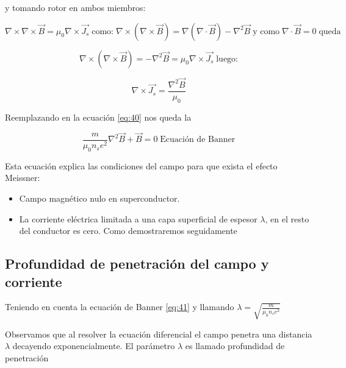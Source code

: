 y tomando rotor en ambos miembros:

\begin{equation*}
	\nabla \times \nabla \times \overrightarrow{B} = \mu_{0}\nabla \times \overrightarrow{J_{s}} \;\text{como:}\;
	\nabla \times (\nabla \times \overrightarrow{B})= \nabla (\nabla \cdot \overrightarrow{B}) - \nabla^{2} \overrightarrow{B}  \;\text{y como}\; \nabla \cdot \overrightarrow{B} =0 \;\text{queda}\;
\end{equation*}

\begin{equation*}
	\nabla \times (\nabla \times \overrightarrow{B})= - \nabla^{2} \overrightarrow{B} = \mu_{0} \nabla \times \overrightarrow{J_{s}}  \;\text{luego:}
\end{equation*}

\begin{equation*}
	\nabla \times \overrightarrow{J_{s}}=\frac{ \nabla^{2} \overrightarrow{B}}{\mu_{0}}
\end{equation*}

Reemplazando en la ecuación \ref{eq:40} nos queda la 

\begin{equation}
\label{eq:41}
	\frac{m}{\mu_{0}n_{s}e^{2}}\nabla^{2} \overrightarrow{B} + \overrightarrow{B} = 0 \; \text{Ecuación de Banner}
\end{equation}

Esta ecuación explica las condiciones del campo para que exista el efecto Meissner:


\begin{itemize}
	\item Campo magnético nulo en superconductor.
	
	\item La corriente eléctrica limitada a una capa superficial de espesor $\lambda$, en el resto del conductor es cero. Como demostraremos seguidamente

\end{itemize}

\subsection{Profundidad de penetración del campo y corriente}

Teniendo en cuenta la ecuación de Banner \ref{eq:41} y llamando $\lambda=\sqrt{\frac{m}{\mu_{0}n_{s}e^{2}}}$

Observamos que al resolver la ecuación diferencial el campo penetra una distancia $\lambda$ decayendo exponencialmente. El parámetro $\lambda$ es llamado profundidad de penetración

